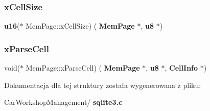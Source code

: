\mbox{\label{struct_mem_page_aecb022d01630da5a48681f8a7e32a419}} 
\subsubsection{xCellSize}
{\footnotesize\ttfamily \textbf{ u16}($\ast$ Mem\+Page\+::x\+Cell\+Size) (\textbf{ Mem\+Page} $\ast$, \textbf{ u8} $\ast$)}

\mbox{\label{struct_mem_page_ac401be6009d535d9fef9cc48af734039}} 
\subsubsection{xParseCell}
{\footnotesize\ttfamily void($\ast$ Mem\+Page\+::x\+Parse\+Cell) (\textbf{ Mem\+Page} $\ast$, \textbf{ u8} $\ast$, \textbf{ Cell\+Info} $\ast$)}



Dokumentacja dla tej struktury została wygenerowana z pliku\+:\begin{DoxyCompactItemize}
\item 
Car\+Workshop\+Management/\textbf{ sqlite3.\+c}\end{DoxyCompactItemize}
